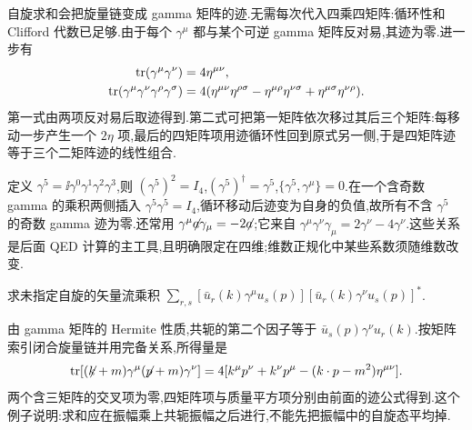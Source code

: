 
自旋求和会把旋量链变成 gamma 矩阵的迹.无需每次代入四乘四矩阵:循环性和 Clifford 代数已足够.由于每个 $\gamma^\mu$ 都与某个可逆 gamma 矩阵反对易,其迹为零.进一步有
\begin{align}
 \tr(\gamma^\mu\gamma^\nu)&=4\eta^{\mu\nu},\\
 \tr(\gamma^\mu\gamma^\nu\gamma^\rho\gamma^\sigma)
 &=4(\eta^{\mu\nu}\eta^{\rho\sigma}-\eta^{\mu\rho}\eta^{\nu\sigma}
       +\eta^{\mu\sigma}\eta^{\nu\rho}).
 \label{eq:four-gamma-trace}
\end{align}
第一式由两项反对易后取迹得到.第二式可把第一矩阵依次移过其后三个矩阵:每移动一步产生一个 $2\eta$ 项,最后的四矩阵项用迹循环性回到原式另一侧,于是四矩阵迹等于三个二矩阵迹的线性组合.

定义 $\gamma^5=\ii\gamma^0\gamma^1\gamma^2\gamma^3$,则 $(\gamma^5)^2=I_4$,$(\gamma^5)^\dagger=\gamma^5$,$\{\gamma^5,\gamma^\mu\}=0$.在一个含奇数 gamma 的乘积两侧插入 $\gamma^5\gamma^5=I_4$,循环移动后迹变为自身的负值,故所有不含 $\gamma^5$ 的奇数 gamma 迹为零.还常用 $\gamma^\mu\slashed a\gamma_\mu=-2\slashed a$;它来自 $\gamma^\mu\gamma^\nu\gamma_\mu=2\gamma^\nu-4\gamma^\nu$.这些关系是后面 QED 计算的主工具,且明确限定在四维;维数正规化中某些系数须随维数改变.

\begin{example}
求未指定自旋的矢量流乘积 $\sum_{r,s}[\bar u_r(k)\gamma^\mu u_s(p)][\bar u_r(k)\gamma^\nu u_s(p)]^*$.
\end{example}
\begin{solution}
由 gamma 矩阵的 Hermite 性质,共轭的第二个因子等于 $\bar u_s(p)\gamma^\nu u_r(k)$.按矩阵索引闭合旋量链并用完备关系,所得量是
\[
 \tr[(\slashed k+m)\gamma^\mu(\slashed p+m)\gamma^\nu]
 =4[k^\mu p^\nu+k^\nu p^\mu-(k\cdot p-m^2)\eta^{\mu\nu}].
\]
两个含三矩阵的交叉项为零,四矩阵项与质量平方项分别由前面的迹公式得到.这个例子说明:求和应在振幅乘上共轭振幅之后进行,不能先把振幅中的自旋态平均掉.
\end{solution}
